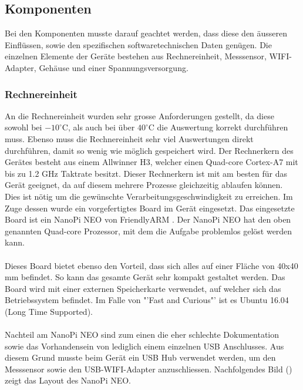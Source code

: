 \subsection{Komponenten}
Bei den Komponenten musste darauf geachtet werden, dass diese den äusseren Einflüssen, sowie den spezifischen softwaretechnischen Daten genügen. Die einzelnen Elemente der Geräte bestehen aus Rechnereinheit, Messsensor, WIFI-Adapter, Gehäuse und einer Spannungsversorgung.

\subsubsection{Rechnereinheit}
An die Rechnereinheit wurden sehr grosse Anforderungen gestellt, da diese sowohl bei $-10^\circ\text{C}$, als auch bei über $40^\circ\text{C}$ die Auswertung korrekt durchführen muss. Ebenso muss die Rechnereinheit sehr viel Auswertungen direkt durchführen, damit so wenig wie möglich gespeichert wird. Der Rechnerkern des Gerätes besteht aus einem Allwinner H3, welcher einen Quad-core Cortex-A7 mit bis zu 1.2 GHz Taktrate besitzt. Dieser Rechnerkern ist mit am besten für das Gerät geeignet, da auf diesem mehrere Prozesse gleichzeitig ablaufen können. Dies ist nötig um die gewünschte Verarbeitungsgeschwindigkeit zu erreichen. Im Zuge dessen wurde ein vorgefertigtes Board im Gerät eingesetzt. Das eingesetzte Board ist ein NanoPi NEO von FriendlyARM \cite{NanoPi}. Der NanoPi NEO hat den oben genannten Quad-core Prozessor, mit dem die Aufgabe problemlos gelöst werden kann. \\\\
Dieses Board bietet ebenso den Vorteil, dass sich alles auf einer Fläche von 40x40 mm befindet. So kann das gesamte Gerät sehr kompakt gestaltet werden. Das Board wird mit einer externen Speicherkarte verwendet, auf welcher sich das Betriebssystem befindet. Im Falle von "'Fast and Curious"' ist es Ubuntu 16.04 (Long Time Supported). \\\\
Nachteil am NanoPi NEO sind zum einen die eher schlechte Dokumentation sowie das Vorhandensein von lediglich einem einzelnen USB Anschlusses. Aus diesem Grund musste beim Gerät ein USB Hub verwendet werden, um den Messsensor sowie den USB-WIFI-Adapter anzuschliessen. Nachfolgendes Bild () zeigt das Layout des NanoPi NEO.

